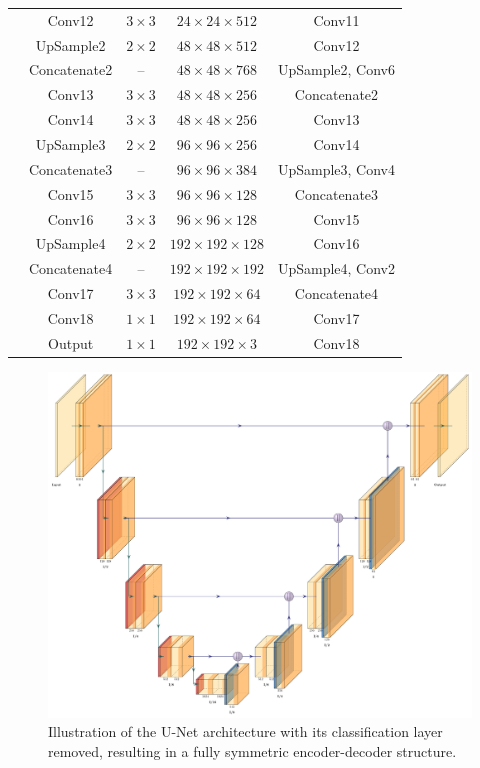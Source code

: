 \begin{table}[htbp]
\begin{tabular}{lcccc}
    & Conv12       & $3 \times 3$ & $24 \times 24 \times 512$  & Conv11 \\ 
    & UpSample2    & $2 \times 2$ & $48 \times 48 \times 512$  & Conv12 \\ 
    & Concatenate2 & --           & $48 \times 48 \times 768$  & UpSample2, Conv6 \\ 
    & Conv13       & $3 \times 3$ & $48 \times 48 \times 256$  & Concatenate2 \\ 
    & Conv14       & $3 \times 3$ & $48 \times 48 \times 256$  & Conv13 \\ 
    & UpSample3    & $2 \times 2$ & $96 \times 96 \times 256$  & Conv14 \\ 
    & Concatenate3 & --           & $96 \times 96 \times 384$  & UpSample3, Conv4 \\ 
    & Conv15       & $3 \times 3$ & $96 \times 96 \times 128$  & Concatenate3 \\ 
    & Conv16       & $3 \times 3$ & $96 \times 96 \times 128$  & Conv15 \\ 
    & UpSample4    & $2 \times 2$ & $192 \times 192 \times 128$ & Conv16 \\ 
    & Concatenate4 & --           & $192 \times 192 \times 192$ & UpSample4, Conv2 \\ 
    & Conv17       & $3 \times 3$ & $192 \times 192 \times 64$  & Concatenate4 \\ 
    & Conv18       & $1 \times 1$ & $192 \times 192 \times 64$  & Conv17 \\ 
    & Output       & $1 \times 1$ & $192 \times 192 \times 3$   & Conv18 \\ 
\bottomrule
\end{tabular}
\end{table}

\begin{figure}
    \centering
    \includegraphics[width=0.80\paperwidth, keepaspectratio]{img/ch6/architectures/unet.pdf}
    \caption{Illustration of the U-Net architecture \cite{ronneberger_u-net_2015} with its classification layer removed, resulting in a fully symmetric encoder-decoder structure.}
    \label{fig:unet-architecture}
\end{figure}

